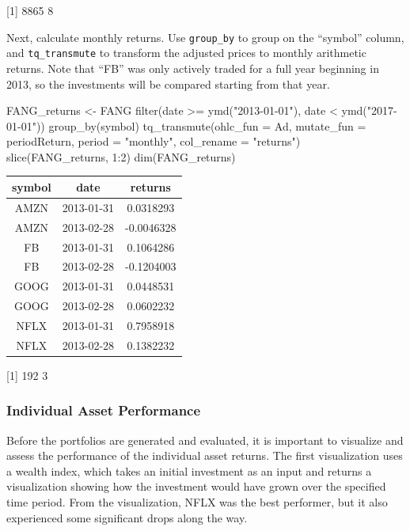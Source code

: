 {[}1{]} 8865 8

\hspace{20 mm}

Next, calculate monthly returns. Use \texttt{group\_by} to group on the
``symbol'' column, and \texttt{tq\_transmute} to transform the adjusted
prices to monthly arithmetic returns. Note that ``FB'' was only actively
traded for a full year beginning in 2013, so the investments will be
compared starting from that year.

\begin{Schunk}
\begin{Sinput}
FANG_returns <- FANG %
    filter(date >= ymd("2013-01-01"),
           date <  ymd("2017-01-01")) %
    group_by(symbol) %
    tq_transmute(ohlc_fun = Ad,
                 mutate_fun = periodReturn,
                 period = "monthly",
                 col_rename = "returns")
slice(FANG_returns, 1:2)
dim(FANG_returns)
\end{Sinput}
\end{Schunk}

\begin{tabular}{ccc}
\toprule
symbol & date & returns\\
\midrule
AMZN & 2013-01-31 & 0.0318293\\
AMZN & 2013-02-28 & -0.0046328\\
FB & 2013-01-31 & 0.1064286\\
FB & 2013-02-28 & -0.1204003\\
GOOG & 2013-01-31 & 0.0448531\\
\addlinespace
GOOG & 2013-02-28 & 0.0602232\\
NFLX & 2013-01-31 & 0.7958918\\
NFLX & 2013-02-28 & 0.1382232\\
\bottomrule
\end{tabular}

{[}1{]} 192 3

\hspace{20 mm}

\subsubsection{Individual Asset
Performance}\label{individual-asset-performance}

Before the portfolios are generated and evaluated, it is important to
visualize and assess the performance of the individual asset returns.
The first visualization uses a wealth index, which takes an initial
investment as an input and returns a visualization showing how the
investment would have grown over the specified time period. From the
visualization, NFLX was the best performer, but it also experienced some
significant drops along the way.

